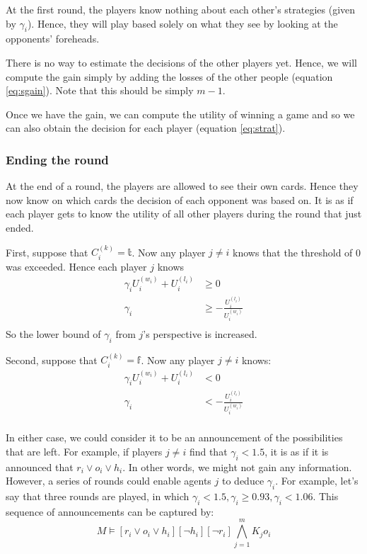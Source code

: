 \documentclass[a4paper,10pt]{article}
\begin{document}
At the first round, the players know nothing about each other's strategies (given by $\gamma_i$). Hence, they will play based solely on what they see by looking at the opponents' foreheads.

There is no way to estimate the decisions of the other players yet. Hence, we will compute the gain simply by adding the losses of the other people (equation \ref{eq:sgain}). Note that this should be simply $m-1$.

Once we have the gain, we can compute the utility of winning a game and so we can also obtain the decision for each player (equation \ref{eq:strat}).

\subsubsection{Ending the round}
At the end of a round, the players are allowed to see their own cards. Hence they now know on which cards the decision of each opponent was based on. It is as if each player gets to know the utility of all other players during the round that just ended.

First, suppose that $C^{(k)}_i = \mathbb{t}$. Now any player $j\neq i$ knows that the threshold of 0 was exceeded. Hence each player $j$ knows 
\begin{align*}
\gamma_i U^{(w_i)}_i + U^{(l_i)}_i &\geq 0\\
\gamma_i &\geq -\frac{U^{(l_i)}_i }{U^{(w_i)}_i}\\
\end{align*}
So the lower bound of $\gamma_i$ from $j$'s perspective is increased.

Second, suppose that $C^{(k)}_i = \mathbb{f}$. Now any player $j\neq i$ knows:
\begin{align*}
\gamma_i U^{(w_i)}_i + U^{(l_i)}_i &< 0\\
\gamma_i &< -\frac{U^{(l_i)}_i }{U^{(w_i)}_i}\\
\end{align*}

In either case, we could consider it to be an announcement of the possibilities that are left. For example, if players $j\neq i$ find that $\gamma_i < 1.5$, it is as if it is announced that $r_i \vee o_i \vee h_i$. In other words, we might not gain any information. However, a series of rounds could enable agents $j$ to deduce $\gamma_i$. For example, let's say that three rounds are played, in which $\gamma_i < 1.5,\gamma_i \geq 0.93,\gamma_i < 1.06$. This sequence of announcements can be captured by:
\begin{equation*}
M\models [r_i \vee o_i \vee h_i][\neg h_i][\neg r_i] \bigwedge_{j=1}^m K_j o_i
\end{equation*}
\end{document}
